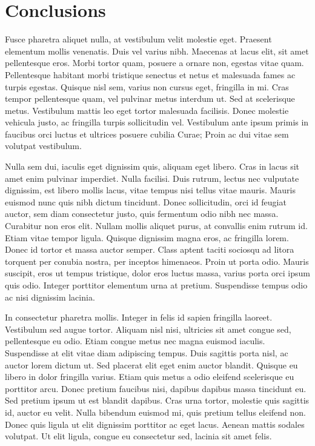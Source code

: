 \documentclass[12pt, a4paper]{article}
\begin{document}
\section{Conclusions}
\label{sec:conc}

Fusce pharetra aliquet nulla, at vestibulum velit molestie eget. Praesent elementum mollis venenatis. Duis vel varius nibh. Maecenas at lacus elit, sit amet pellentesque eros. Morbi tortor quam, posuere a ornare non, egestas vitae quam. Pellentesque habitant morbi tristique senectus et netus et malesuada fames ac turpis egestas. Quisque nisl sem, varius non cursus eget, fringilla in mi. Cras tempor pellentesque quam, vel pulvinar metus interdum ut. Sed at scelerisque metus. Vestibulum mattis leo eget tortor malesuada facilisis. Donec molestie vehicula justo, ac fringilla turpis sollicitudin vel. Vestibulum ante ipsum primis in faucibus orci luctus et ultrices posuere cubilia Curae; Proin ac dui vitae sem volutpat vestibulum.

Nulla sem dui, iaculis eget dignissim quis, aliquam eget libero. Cras in lacus sit amet enim pulvinar imperdiet. Nulla facilisi. Duis rutrum, lectus nec vulputate dignissim, est libero mollis lacus, vitae tempus nisi tellus vitae mauris. Mauris euismod nunc quis nibh dictum tincidunt. Donec sollicitudin, orci id feugiat auctor, sem diam consectetur justo, quis fermentum odio nibh nec massa. Curabitur non eros elit. Nullam mollis aliquet purus, at convallis enim rutrum id. Etiam vitae tempor ligula. Quisque dignissim magna eros, ac fringilla lorem. Donec id tortor et massa auctor semper. Class aptent taciti sociosqu ad litora torquent per conubia nostra, per inceptos himenaeos. Proin ut porta odio. Mauris suscipit, eros ut tempus tristique, dolor eros luctus massa, varius porta orci ipsum quis odio. Integer porttitor elementum urna at pretium. Suspendisse tempus odio ac nisi dignissim lacinia.

In consectetur pharetra mollis. Integer in felis id sapien fringilla laoreet. Vestibulum sed augue tortor. Aliquam nisl nisi, ultricies sit amet congue sed, pellentesque eu odio. Etiam congue metus nec magna euismod iaculis. Suspendisse at elit vitae diam adipiscing tempus. Duis sagittis porta nisl, ac auctor lorem dictum ut. Sed placerat elit eget enim auctor blandit. Quisque eu libero in dolor fringilla varius. Etiam quis metus a odio eleifend scelerisque eu porttitor arcu. Donec pretium faucibus nisi, dapibus dapibus massa tincidunt eu. Sed pretium ipsum ut est blandit dapibus. Cras urna tortor, molestie quis sagittis id, auctor eu velit. Nulla bibendum euismod mi, quis pretium tellus eleifend non. Donec quis ligula ut elit dignissim porttitor ac eget lacus. Aenean mattis sodales volutpat. Ut elit ligula, congue eu consectetur sed, lacinia sit amet felis.
\end{document}
